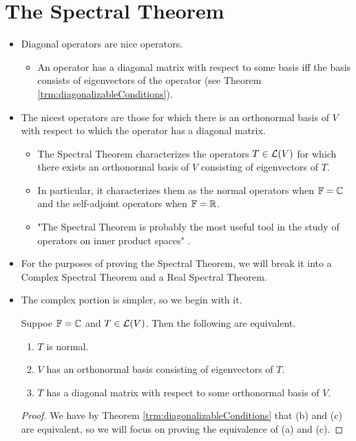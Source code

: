 \documentclass[../main.tex]{subfiles}
\begin{document}
\section{The Spectral Theorem}
\begin{itemize}
    \item Diagonal operators are nice operators.
    \begin{itemize}
        \item An operator has a diagonal matrix with respect to some basis iff the basis consists of eigenvectors of the operator (see Theorem \ref{trm:diagonalizableConditions}).
    \end{itemize}
    \item The nicest operators are those for which there is an orthonormal basis of $V$ with respect to which the operator has a diagonal matrix.
    \begin{itemize}
        \item The Spectral Theorem characterizes the operators $T\in\mathcal{L}(V)$ for which there exists an orthonormal basis of $V$ consisting of eigenvectors of $T$.
        \item In particular, it characterizes them as the normal operators when $\mathbb{F}=\mathbb{C}$ and the self-adjoint operators when $\mathbb{F}=\mathbb{R}$.
        \item "The Spectral Theorem is probably the most useful tool in the study of operators on inner product spaces" \parencite[217]{bib:Axler}.
    \end{itemize}
    \item For the purposes of proving the Spectral Theorem, we will break it into a Complex Spectral Theorem and a Real Spectral Theorem.
    \item The complex portion is simpler, so we begin with it.
    \begin{theorem}\label{trm:ComplexSpectral}
        Suppoe $\mathbb{F}=\mathbb{C}$ and $T\in\mathcal{L}(V)$. Then the following are equivalent.
        \begin{enumerate}[label={\textup{(}\alph*\textup{)}}]
            \item $T$ is normal.
            \item $V$ has an orthonormal basis consisting of eigenvectors of $T$.
            \item $T$ has a diagonal matrix with respect to some orthonormal basis of $V$.
        \end{enumerate}
        \begin{proof}
            We have by Theorem \ref{trm:diagonalizableConditions} that (b) and (c) are equivalent, so we will focus on proving the equivalence of (a) and (c).\par

\end{proof}
\end{theorem}
\end{itemize}
\end{document}
